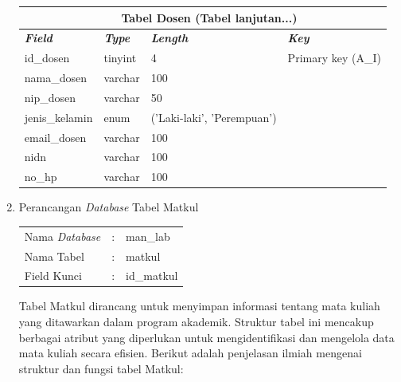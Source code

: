 \begin{enumerate}
{\begin{longtable}{l l l l}
				      \multicolumn{4}{c}{\tablename\ \thetable\ {Tabel Dosen} \space (Tabel lanjutan...)}                   \\
				      \hline
				      \textbf{\textit{Field}} & \textbf{\textit{Type}} & \textbf{\textit{Length}}   & \textbf{\textit{Key}} \\
				      \hline
				      \endhead

				      id\_dosen               & tinyint                & 4                          & Primary key (A\_I)    \\
				      nama\_dosen             & varchar                & 100                        &                       \\
				      nip\_dosen              & varchar                & 50                         &                       \\
				      jenis\_kelamin          & enum                   & ('Laki-laki', 'Perempuan') &                       \\
				      email\_dosen            & varchar                & 100                        &                       \\
				      nidn                    & varchar                & 100                        &                       \\
				      no\_hp                  & varchar                & 100                        &                       \\
				      \hline
			      \end{longtable}
		      }

	\item Perancangan \textit{Database} Tabel Matkul \\
	      \begin{tabular}{lll}
		      Nama \textit{Database} & : & man\_lab   \\
		      Nama Tabel             & : & matkul     \\
		      Field Kunci            & : & id\_matkul \\
	      \end{tabular}

	      Tabel Matkul dirancang untuk menyimpan informasi tentang mata kuliah yang ditawarkan dalam program akademik. Struktur tabel ini mencakup berbagai atribut yang diperlukan untuk mengidentifikasi dan mengelola data mata kuliah secara efisien. Berikut adalah penjelasan ilmiah mengenai struktur dan fungsi tabel Matkul:


\end{enumerate}
